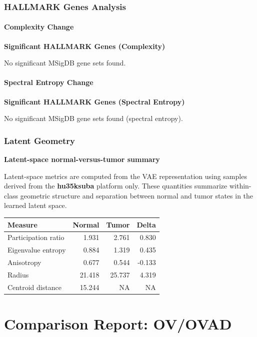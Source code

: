 \documentclass[
  letterpaper,
  DIV=11,
  numbers=noendperiod,
  openany,
  oneside]{scrreprt}
\begin{document}
\subsection{HALLMARK Genes Analysis}

\subsubsection{Complexity Change}

\textbf{Significant HALLMARK Genes (Complexity)}

No significant MSigDB gene sets found.

\subsubsection{Spectral Entropy Change}

\textbf{Significant HALLMARK Genes (Spectral Entropy)}

No significant MSigDB gene sets found (spectral entropy).

\subsection{Latent Geometry}

\textbf{Latent-space normal-versus-tumor summary}

Latent-space metrics are computed from the VAE representation using
samples derived from the \textbf{hu35ksuba} platform only. These
quantities summarize within-class geometric structure and separation
between normal and tumor states in the learned latent space.

\begin{longtable}[]{@{}lrrr@{}}
\toprule\noalign{}
Measure & Normal & Tumor & Delta \\
\midrule\noalign{}
\endhead
\bottomrule\noalign{}
\endlastfoot
Participation ratio & 1.931 & 2.761 & 0.830 \\
Eigenvalue entropy & 0.884 & 1.319 & 0.435 \\
Anisotropy & 0.677 & 0.544 & -0.133 \\
Radius & 21.418 & 25.737 & 4.319 \\
Centroid distance & 15.244 & NA & NA \\
\end{longtable}

\chapter{Comparison Report: OV/OVAD}\label{comparison-report-ovovad}
\end{document}
